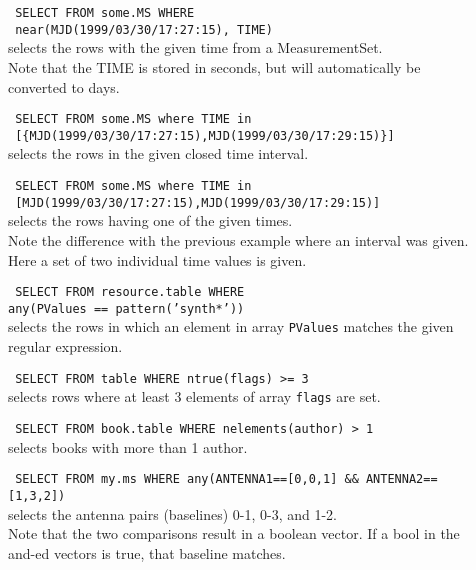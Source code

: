 \begin{description}
  \item[] \texttt{ SELECT FROM some.MS WHERE }
    \\\texttt{ near(MJD(1999/03/30/17:27:15), TIME) }
    \\selects the rows with the given time from a MeasurementSet.
    \\Note that the TIME is stored in seconds, but will automatically
	be converted to days.

   \item[] \texttt{ SELECT FROM some.MS where TIME in }
     \\\texttt{ [\{MJD(1999/03/30/17:27:15),MJD(1999/03/30/17:29:15)\}] }
     \\selects the rows in the given closed time interval.

   \item[] \texttt{ SELECT FROM some.MS where TIME in }
     \\\texttt{ [MJD(1999/03/30/17:27:15),MJD(1999/03/30/17:29:15)] }
     \\selects the rows having one of the given times.
     \\Note the difference with the previous example where an interval
     was given. Here a set of two individual time values is given.

  \item[] \texttt{ SELECT FROM resource.table WHERE}
     \\\texttt{any(PValues == pattern('synth*'))}
     \\selects the rows in which an element in array
     \texttt{PValues} matches the given regular expression.

  \item[] \texttt{ SELECT FROM table WHERE ntrue(flags) >= 3}
     \\selects rows where at least 3 elements of array \texttt{flags}
     are set.

  \item[] \texttt{ SELECT FROM book.table WHERE nelements(author) > 1}
     \\selects books with more than 1 author.

  \item[] \texttt{ SELECT FROM my.ms WHERE
         any(ANTENNA1==[0,0,1] \&\& ANTENNA2==[1,3,2])}
     \\selects the antenna pairs (baselines) 0-1, 0-3, and 1-2.
     \\Note that the two comparisons result in a boolean vector. If
       a bool in the and-ed vectors is true, that baseline matches.


\end{description}
